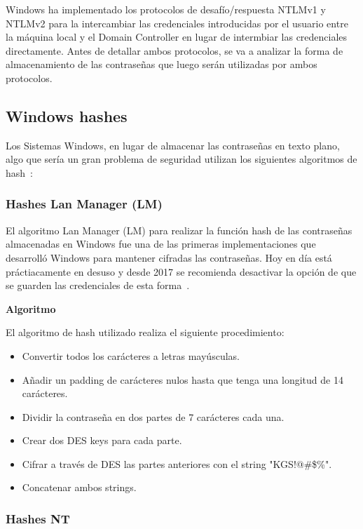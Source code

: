 Windows ha implementado los protocolos de desafío/respuesta NTLMv1 y NTLMv2 para la intercambiar las credenciales introducidas por el usuario entre la máquina local y el Domain Controller en lugar de intermbiar las credenciales directamente. Antes de detallar ambos protocolos, se va a analizar la forma de almacenamiento de las contraseñas que luego serán utilizadas por ambos protocolos. 


\subsection{Windows hashes}

Los Sistemas Windows, en lugar de almacenar las contraseñas en texto plano, algo que sería un gran problema de seguridad utilizan los siguientes algoritmos de hash~\cite{Capitulo3:Hashes}:

\subsubsection{Hashes Lan Manager (LM)}

El algoritmo Lan Manager (LM) para realizar la función hash de las contraseñas almacenadas en Windows fue una de las primeras implementaciones que desarrolló Windows para mantener cifradas las contraseñas. Hoy en día está práctiacamente en desuso y desde 2017 se recomienda desactivar la opción de que se guarden las credenciales de esta forma~\cite{Capitulo3:LMDeprecated}. 

\textbf{Algoritmo}

El algoritmo de hash utilizado realiza el siguiente procedimiento: 

\begin{itemize}
\item Convertir todos los carácteres a letras mayúsculas.
\item Añadir un padding de carácteres nulos hasta que tenga una longitud de 14 carácteres. 
\item Dividir la contraseña en dos partes de 7 carácteres cada una. 
\item Crear dos DES keys para cada parte. 
\item Cifrar a través de DES las partes anteriores con el string "KGS!@\#\$\%".
\item Concatenar ambos strings.
\end{itemize}

\subsubsection{Hashes NT}

